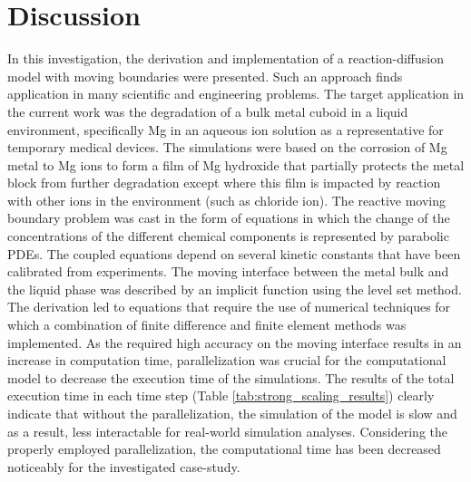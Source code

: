\section{Discussion}

In this investigation, the derivation and implementation of a reaction-diffusion model with moving boundaries were presented. Such an approach finds application in many scientific and engineering problems. The target application in the current work was the degradation of a bulk metal cuboid in a liquid environment, specifically Mg in an aqueous ion solution as a representative for temporary medical devices. The simulations were based on the corrosion of Mg metal to Mg ions to form a film of Mg hydroxide that partially protects the metal block from further degradation except where this film is impacted by reaction with other ions in the environment (such as chloride ion). The reactive moving boundary problem was cast in the form of equations in which the change of the concentrations of the different chemical components is represented by parabolic \gls{PDE}s. The coupled equations depend on several kinetic constants that have been calibrated from experiments. The moving interface between the metal bulk and the liquid phase was described by an implicit function using the level set method. The derivation led to equations that require the use of numerical techniques for which a combination of finite difference and finite element methods was implemented. As the required high accuracy on the moving interface results in an increase in computation time, parallelization was crucial for the computational model to decrease the execution time of the simulations. The results of the total execution time in each time step (Table \ref{tab:strong_scaling_results}) clearly indicate that without the parallelization, the simulation of the model is slow and as a result, less interactable for real-world simulation analyses. Considering the properly employed parallelization, the computational time has been decreased noticeably for the investigated case-study.

